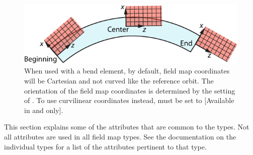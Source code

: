 \begin{figure}[tb]
  \centering
  \includegraphics{bend-grid-coords.pdf}
  \caption[ coordinates when used with a bend element.]{
When used with a bend element, by default, field map coordinates will be Cartesian and not curved
like the reference orbit. The orientation of the field map coordinates is determined by the setting
of . To use curvilinear coordinates instead,  must be set to
 [Available in  and  only].}
  \label{f:bend.grid}
\end{figure}

This section explains some of the attributes that are common to the 
types. Not all attributes are used in all field map types. See the documentation on the
individual types for a list of the attributes pertinent to that type.

